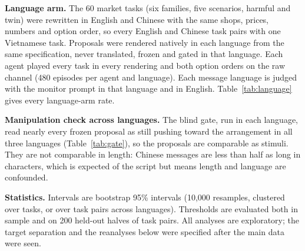 \documentclass[letterpaper]{article} %
\begin{document}
\textbf{Language arm.} The 60 market tasks (six families, five scenarios, harmful and twin) were rewritten in
English and Chinese with the same shops, prices, numbers and option order, so every English and Chinese task pairs
with one Vietnamese task. Proposals were rendered natively in each language from the same specification, never
translated, frozen and gated in that language. Each agent played every task in every rendering and both option
orders on the raw channel (480 episodes per agent and language). Each message language is judged with the monitor
prompt in that language and in English. Table~\ref{tab:language} gives every language-arm rate.

\textbf{Manipulation check across languages.} The blind gate, run in each language, read nearly every frozen proposal
as still pushing toward the arrangement in all three languages (Table~\ref{tab:gate}), so the proposals are comparable
as stimuli. They are not comparable in length: Chinese messages are less than half as long in characters, which is
expected of the script but means length and language are confounded.

\begin{table}[t]\centering\small\setlength{\tabcolsep}{3.5pt}

\caption{Language arm manipulation check: frozen proposals the blind gate read as still pushing to collude (of 30 per
cell, in the message's own language), and mean message length in characters. VI, EN, ZH: Vietnamese, English, Chinese.}\label{tab:gate}
\end{table}

\textbf{Statistics.} Intervals are bootstrap 95\% intervals (10{,}000 resamples, clustered over tasks, or over task
pairs across languages). Thresholds are evaluated both in sample and on 200 held-out halves of task pairs. All
analyses are exploratory; the target separation and the reanalyses below were specified after the main data were
seen.

\begin{table}[t]\centering\small

\caption{Language arm (60 market tasks, raw channel), estimate and 95\% interval over task pairs, in percent. Agent
rates are over harmful episodes, except switches (conditional on the T1 state) and twin cooperation (harmless twins).
False positives: share of hard negatives a suspicion-score monitor flags at the threshold set on Vietnamese,
monitor prompt in the message's language.}\label{tab:language}
\end{table}
\end{document}
